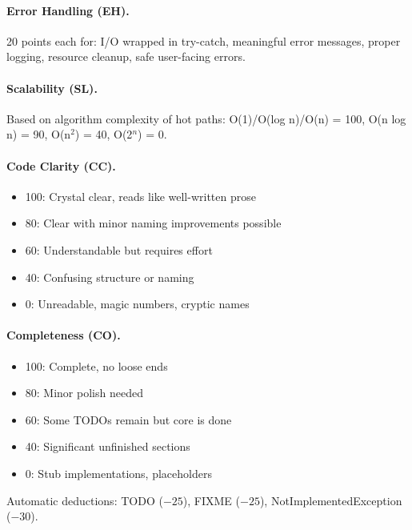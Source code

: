 \paragraph{Error Handling (EH).}
20 points each for: I/O wrapped in try-catch, meaningful error messages,
proper logging, resource cleanup, safe user-facing errors.

\paragraph{Scalability (SL).}
Based on algorithm complexity of hot paths:
O(1)/O(log n)/O(n) = 100, O(n log n) = 90, O(n$^2$) = 40, O(2$^n$) = 0.

\paragraph{Code Clarity (CC).}
\begin{itemize}
    \item 100: Crystal clear, reads like well-written prose
    \item 80: Clear with minor naming improvements possible
    \item 60: Understandable but requires effort
    \item 40: Confusing structure or naming
    \item 0: Unreadable, magic numbers, cryptic names
\end{itemize}

\paragraph{Completeness (CO).}
\begin{itemize}
    \item 100: Complete, no loose ends
    \item 80: Minor polish needed
    \item 60: Some TODOs remain but core is done
    \item 40: Significant unfinished sections
    \item 0: Stub implementations, placeholders
\end{itemize}

Automatic deductions: TODO ($-25$), FIXME ($-25$), NotImplementedException ($-30$).
